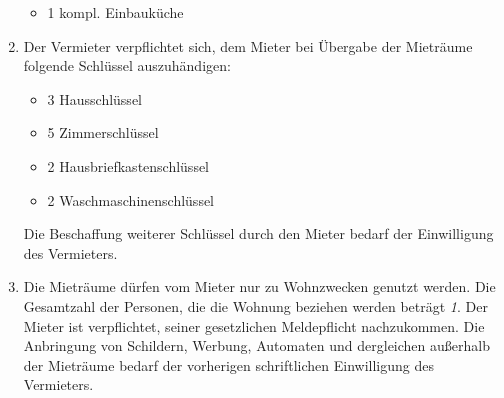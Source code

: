 \documentclass{scrreprt}[12pt,a4paper,twoside,duplex]
\begin{document}
\begin{contract}
\begin{enumerate}
\begin{itemize}
  \color{zuBearbeiten}
  \item 1 kompl. Einbauküche
\end{itemize}
\item Der Vermieter verpflichtet sich, dem Mieter bei Übergabe der Mieträume
folgende Schlüssel auszuhändigen:
\begin{itemize}
  \color{zuBearbeiten}
  \item 3 Hausschlüssel
  \item 5 Zimmerschlüssel
  \item 2 Hausbriefkastenschlüssel
  \item 2 Waschmaschinenschlüssel
\end{itemize}
Die Beschaffung weiterer Schlüssel durch den Mieter bedarf der Einwilligung des
Vermieters.
\item Die Mieträume dürfen vom Mieter nur zu Wohnzwecken genutzt werden. Die
Gesamtzahl der Personen, die die Wohnung beziehen werden beträgt \textsl{1}.
Der Mieter ist verpflichtet, seiner gesetzlichen Meldepflicht nachzukommen. Die
Anbringung von Schildern, Werbung, Automaten und dergleichen außerhalb der
Mieträume bedarf der vorherigen schriftlichen Einwilligung des Vermieters.
\end{enumerate}
\end{contract}
\end{document}
